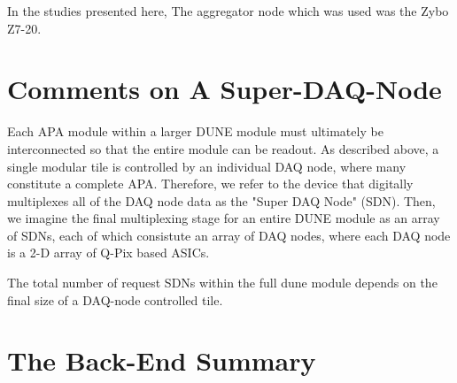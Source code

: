In the studies presented here, The aggregator node which was used was the Zybo Z7-20.


\section{Comments on A Super-DAQ-Node}

Each APA module within a larger DUNE module must ultimately be interconnected so that the entire module can be readout.
As described above, a single modular tile is controlled by an individual DAQ node, where many constitute a complete APA.
Therefore, we refer to the device that digitally multiplexes all of the DAQ node data as the "Super DAQ Node" (SDN).
Then, we imagine the final multiplexing stage for an entire DUNE module as an array of SDNs, each of which consistute an array of DAQ nodes, where each DAQ node is a 2-D array of Q-Pix based ASICs.

The total number of request SDNs within the full dune module depends on the final size of a DAQ-node controlled tile.


\section{The Back-End Summary}
